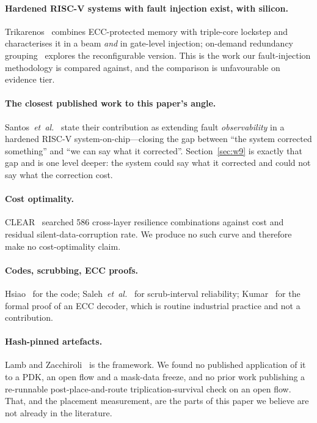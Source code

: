 \documentclass[11pt,a4paper]{article}
\begin{document}
\paragraph{Hardened RISC-V systems with fault injection exist, with
silicon.}
Trikarenos~\cite{rogenmoser2023} combines ECC-protected memory with
triple-core lockstep and characterises it in a beam \emph{and} in
gate-level injection; on-demand redundancy grouping~\cite{odrg2022}
explores the reconfigurable version. This is the work our fault-injection
methodology is compared against, and the comparison is unfavourable on
evidence tier.

\paragraph{The closest published work to this paper's angle.}
Santos~\emph{et~al.}~\cite{santos2023} state their contribution as
extending fault \emph{observability} in a hardened RISC-V
system-on-chip---closing the gap between ``the system corrected
something'' and ``we can say what it corrected''.
Section~\ref{sec:w9} is exactly that gap and is one level deeper: the
system could say what it corrected and could not say what the correction
cost.

\paragraph{Cost optimality.}
CLEAR~\cite{clear2018} searched 586 cross-layer resilience combinations
against cost and residual silent-data-corruption rate. We produce no such
curve and therefore make no cost-optimality claim.

\paragraph{Codes, scrubbing, ECC proofs.}
Hsiao~\cite{hsiao1970} for the code; Saleh~\emph{et~al.}~\cite{saleh1990}
for scrub-interval reliability; Kumar~\cite{kumar2023} for the formal
proof of an ECC decoder, which is routine industrial practice and not a
contribution.

\paragraph{Hash-pinned artefacts.}
Lamb and Zacchiroli~\cite{lamb2022} is the framework. We found no
published application of it to a PDK, an open flow and a mask-data
freeze, and no prior work publishing a re-runnable post-place-and-route
triplication-survival check on an open flow. That, and the placement
measurement, are the parts of this paper we believe are not already in
the literature.
\end{document}
